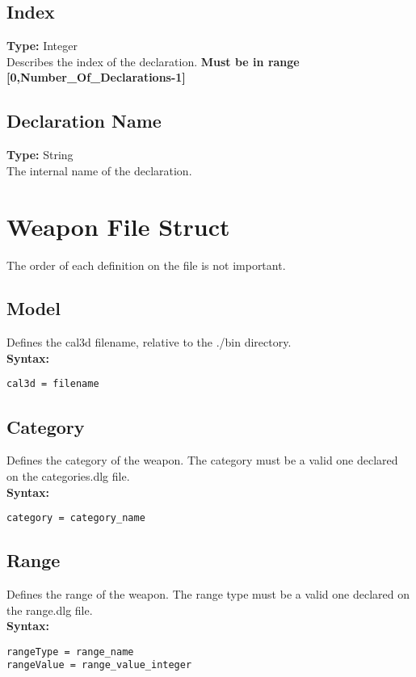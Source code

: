 \documentclass[letterpaper,12pt]{article}
\begin{document}
\subsection{Index}
{\bf Type: }Integer\\
Describes the index of the declaration. {\bf Must be in range
[0,Number\_Of\_Declarations-1]}

\subsection{Declaration Name}
{\bf Type: }String\\
The internal name of the declaration.

\section{Weapon File Struct}

The order of each definition on the file is not important. 

\subsection{Model}

Defines the cal3d filename, relative to the ./bin directory.\\

{\bf Syntax: }
\begin{verbatim}
cal3d = filename
\end{verbatim}

\subsection{Category}

Defines the category of the weapon. The category must be a valid one 
declared on the categories.dlg file.\\

{\bf Syntax: }
\begin{verbatim}
category = category_name
\end{verbatim}

\subsection{Range}

Defines the range of the weapon. The range type must be a valid one 
declared on the range.dlg file.\\

{\bf Syntax: }
\begin{verbatim}
rangeType = range_name
rangeValue = range_value_integer
\end{verbatim}
\end{document}
